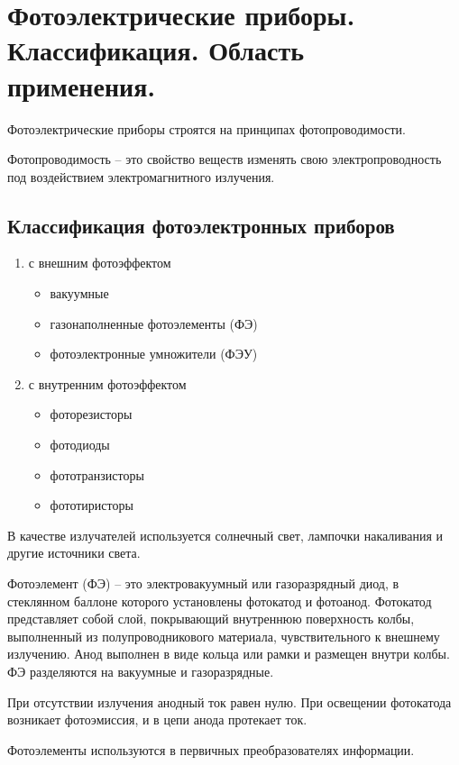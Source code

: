 \documentclass[unicode, 12pt, a4paper, oneside]{article}
\begin{document}
\section{Фотоэлектрические приборы. Классификация. Область применения.}

Фотоэлектрические приборы строятся на принципах фотопроводимости.

Фотопроводимость – это свойство веществ изменять свою электропроводность под воздействием электромагнитного излучения.

\subsection*{Классификация фотоэлектронных приборов}

\begin{enumerate}
\item с внешним фотоэффектом
	\begin{itemize}
	\item вакуумные
	\item газонаполненные фотоэлементы (ФЭ)
	\item фотоэлектронные умножители (ФЭУ)
	\end{itemize}
\item с внутренним фотоэффектом
	\begin{itemize}
	\item фоторезисторы
	\item фотодиоды
	\item фототранзисторы
	\item фототиристоры
	\end{itemize}
\end{enumerate}

В качестве излучателей используется солнечный свет, лампочки накаливания и другие источники света.

Фотоэлемент (ФЭ) – это электровакуумный или газоразрядный диод, в стеклянном баллоне которого установлены фотокатод и фотоанод. Фотокатод представляет собой слой, покрывающий внутреннюю поверхность колбы, выполненный из полупроводникового материала, чувствительного к внешнему излучению. Анод выполнен в виде кольца или рамки и размещен внутри колбы. ФЭ разделяются на вакуумные и газоразрядные.

При отсутствии излучения анодный ток равен нулю. При освещении фотокатода возникает фотоэмиссия, и в цепи анода протекает ток.

Фотоэлементы используются в первичных преобразователях информации.
\end{document}
